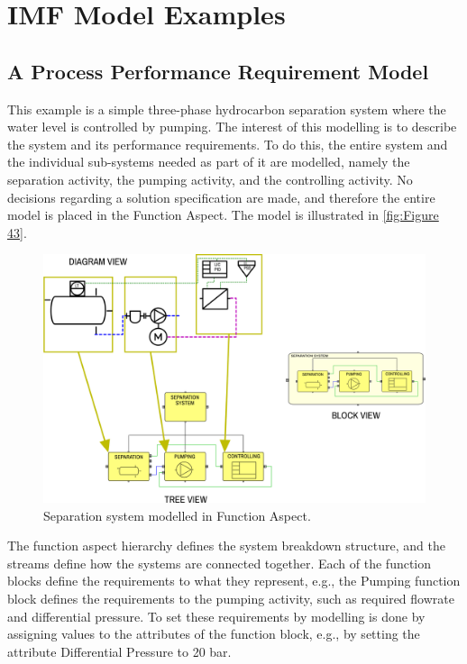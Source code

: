 \documentclass[../main.tex]{subfiles}
\begin{document}
\section{IMF Model Examples}
\subsection{A Process Performance
  Requirement Model}
This example is a simple three-phase hydrocarbon separation system where the water level
is controlled by pumping. The interest of this modelling is to describe the system and its performance requirements.
To do this, the entire system and the individual sub-systems needed as part of it are modelled, namely the separation
activity, the pumping activity, and the controlling activity. No decisions regarding a solution specification are
made, and therefore the entire model is placed in the Function Aspect. The model is illustrated in \autoref{fig:Figure 43}.

\begin{figure}[htb]
  \centering
  \includegraphics[width=1\textwidth]{img/IMFmanual-img062.png}
  \caption{Separation system modelled in Function Aspect.}
  \label{fig:Figure 43}
\end{figure}

The function aspect hierarchy defines the system breakdown structure, and the streams define how the systems are
connected together. Each of the function blocks define the requirements to what they represent, e.g., the
Pumping function block defines the requirements to the pumping activity, such as required flowrate and
differential pressure. To set these requirements by modelling is done by assigning values to the attributes of the
function block, e.g., by setting the attribute Differential Pressure to 20 bar.
\end{document}
